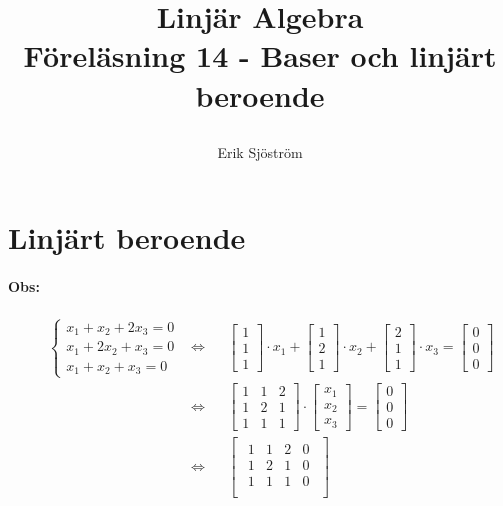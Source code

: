 
\usepackage{gauss}

\title{
	 Linjär Algebra\\
	 Föreläsning 14 - Baser och linjärt beroende
    \author{Erik Sjöström}
}

\maketitle
\section{Linjärt beroende} %
\label{sec:linj_rt_beroende}
\paragraph{Obs:} %
\label{par:obs_}
\begin{align*}
&&\begin{cases}
	x_1 + x_2 + 2x_3 = 0\\
	x_1 + 2x_2 + x_3 = 0\\
	x_1 + x_2 + x_3 = 0
\end{cases}
& \Leftrightarrow
&& \begin{bmatrix} 1\\1\\1 \end{bmatrix} \cdot x_1 + 
\begin{bmatrix} 1\\2\\1 \end{bmatrix} \cdot x_2 + 
\begin{bmatrix} 2\\1\\1 \end{bmatrix} \cdot x_3 = 
\begin{bmatrix} 0\\0\\0 \end{bmatrix}\\
&&
& \Leftrightarrow 
&&\begin{bmatrix} 1&1&2\\1&2&1\\1&1&1 \end{bmatrix} \cdot \begin{bmatrix} x_1\\x_2\\x_3 \end{bmatrix} = \begin{bmatrix} 0\\0\\0 \end{bmatrix}\\
&&
& \Leftrightarrow
&& \begin{bmatrix}
	\begin{array}{ccc|c}
	1 & 1 & 2 & 0\\
	1 & 2 & 1 & 0\\
	1 & 1 & 1 & 0\\
\end{array} 
\end{bmatrix}
\end{align*}
